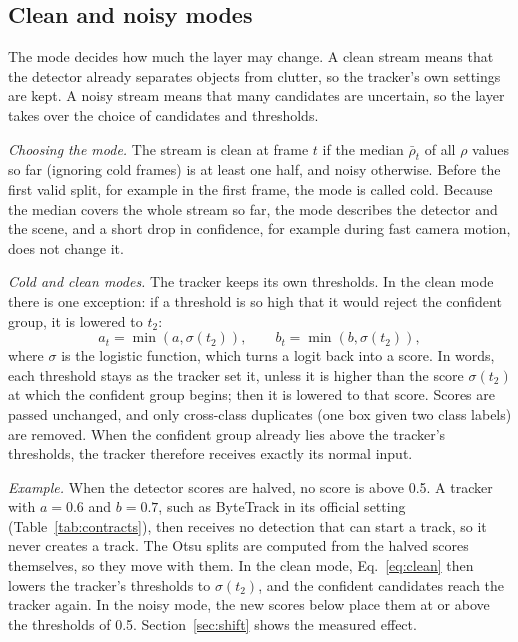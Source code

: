 \subsection{Clean and noisy modes}\label{sec:regimes}
The mode decides how much the layer may change. A clean stream means that
the detector already separates objects from clutter, so the tracker's own
settings are kept. A noisy stream means that many candidates are uncertain,
so the layer takes over the choice of candidates and thresholds.

\emph{Choosing the mode.} The stream is clean at frame $t$ if the median
$\bar\rho_t$ of all $\rho$ values so far (ignoring cold frames) is at least
one half, and noisy otherwise. Before the first valid split, for example in
the first frame, the mode is called cold. Because the median covers the whole
stream so far, the mode describes the detector and the scene, and a short
drop in confidence, for example during fast camera motion, does not change
it.

\emph{Cold and clean modes.} The tracker keeps its own thresholds. In the
clean mode there is one exception: if a threshold is so high that it would
reject the confident group, it is lowered to $t_2$:
\begin{equation}
a_t=\min\!\left(a,\sigma(t_2)\right),\qquad b_t=\min\!\left(b,\sigma(t_2)\right),
\label{eq:clean}
\end{equation}
where $\sigma$ is the logistic function, which turns a logit back into a
score. In words, each threshold stays as the tracker set it, unless it is
higher than the score $\sigma(t_2)$ at which the confident group begins; then
it is lowered to that score. Scores are passed unchanged, and only cross-class duplicates (one box
given two class labels) are removed. When the confident group already lies
above the tracker's thresholds, the tracker therefore receives exactly its
normal input.

\emph{Example.} When the detector scores are halved, no score is above 0.5.
A tracker with $a=0.6$ and $b=0.7$, such as ByteTrack in its official setting
(Table~\ref{tab:contracts}), then receives no detection that can start a
track, so it never creates a track. The Otsu splits are computed from the
halved scores themselves, so they move with them. In the clean mode,
Eq.~\eqref{eq:clean} then lowers the tracker's thresholds to $\sigma(t_2)$,
and the confident candidates reach the tracker again. In the noisy mode, the
new scores below place them at or above the thresholds of 0.5.
Section~\ref{sec:shift} shows the measured effect.

